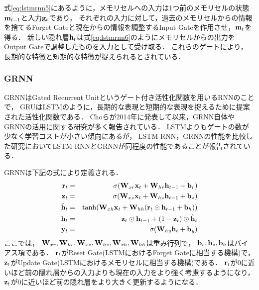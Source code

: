 式\ref{eq:lstmrnn5}にあるように，メモリセルへの入力は1つ前のメモリセルの状態${\bf m}_{t-1}$と入力${\bf g}_t$であり，
それぞれの入力に対して，過去のメモリセルからの情報を捨てるForget Gateと現在からの情報を調整するInput Gateを作用させ，${\bf m}_t$を得る．
新しい隠れ層${\bf h}_t$は式\ref{eq:lstmrnn6}のようにメモリセルからの出力をOutput Gateで調整したものを入力として受け取る．
これらのゲートにより，
長期的な特徴と短期的な特徴が捉えられるとされている．

\subsubsection{GRNN}
GRNNはGated Recurrent Unit\cite{cho2014learning}というゲート付き活性化関数を用いるRNNのことで，
GRUはLSTMのように，長期的な表現と短期的な表現を捉えるために提案された活性化関数である．
Choら\cite{cho2014learning}が2014年に発表して以来，GRNN自体やGRNNの活用に関する研究が多く報告されている\cite{chung2014empirical, zaremba2015empirical, chung2015gated, karpathy2015visualizing, biswassentiment, pezeshki2015sequence}．
LSTMよりもゲートの数が少なく学習コストが小さい傾向にあるが，
LSTM-RNN，GRNNの性能を比較した研究\cite{chung2014empirical, zaremba2015empirical}においてLSTM-RNNとGRNNが同程度の性能であることが報告されている．

GRNNは下記の式により定義される．
\begin{eqnarray}
\label{eq:grurnn1}
{\bf r}_t &=& \sigma({\bf W}_{xr}{\bf x}_t + {\bf W}_{hr}{\bf h}_{t-1} + {\bf b}_r)\\
\label{eq:grurnn2}
{\bf z}_t &=& \sigma({\bf W}_{xz}{\bf x}_t + {\bf W}_{hz}{\bf h}_{t-1} + {\bf b}_z)\\
\label{eq:grurnn3}
\tilde{{\bf h}}_t &=& \tanh({\bf W}_{xh}{\bf x}_t + {\bf W}_{hh}({\bf r}_t \odot {\bf h}_{t-1} + {\bf b}_h))\\
\label{eq:grurnn4}
{\bf h}_t &=& {\bf z}_t \odot {\bf h}_{t-1} + (1 - {\bf z}_t) \odot \tilde{{\bf h}}_t\\
\label{eq:grurnn5}
{\bf y}_t &=& \sigma( {\bf W}_{hy} {\bf h}_t + {\bf b}_y)
\end{eqnarray}
ここでは，
${\bf W}_{xr}, {\bf W}_{hr}, {\bf W}_{xz}, {\bf W}_{hz}, {\bf W}_{xh}, {\bf W}_{hh}$は重み行列で， 
${\bf b}_r, {\bf b}_z, {\bf b}_h$はバイアス項である．
${\bf r}_t$がReset Gate(LSTMにおけるForget Gateに相当する機構)で，  
${\bf z}_t$がUpdate Gate(LSTMにおけるメモリセルに相当する機構)である．
${\bf r}_t$が0に近いほど前の隠れ層からの入力よりも現在の入力をより強く考慮するようになり，
${\bf z}_t$が0に近いほど前の隠れ層をより大きく更新するようになる．


